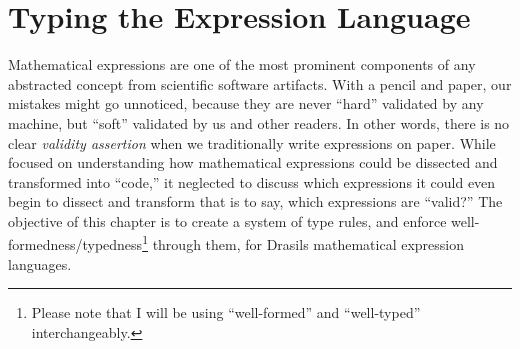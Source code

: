 \chapter{Typing the Expression Language}
\label{chap:typedExpr}

Mathematical expressions are one of the most prominent components of any
abstracted concept from scientific software artifacts. With a pencil and paper,
our mistakes might go unnoticed, because they are never ``hard'' validated by
any machine, but ``soft'' validated by us and other readers. In other words,
there is no clear \textit{validity assertion} when we traditionally write
expressions on paper. While  focused on understanding how
mathematical expressions could be dissected and transformed into ``code,'' it
neglected to discuss which expressions it could even begin to dissect and
transform \textemdash{} that is to say, which expressions are ``valid?'' The
objective of this chapter is to create a system of type rules, and enforce
well-formedness/typedness\footnote{Please note that I will be using
      ``well-formed'' and ``well-typed'' interchangeably.} through them, for Drasils
mathematical expression languages.


